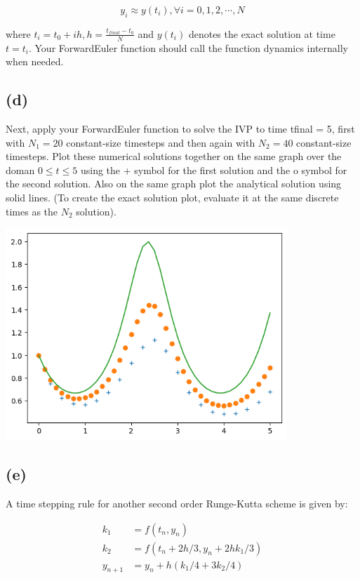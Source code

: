 \documentclass[11pt]{article}
\begin{document}
\[ y_i \approx y(t_i), \forall i = 0, 1, 2, \cdots, N \]

where $t_i = t_0 + ih, h = \frac{t_{final} - t_0}{N}$ and $y(t_i)$ denotes the exact solution at time $t = t_i$. Your ForwardEuler function should call the function dynamics internally when needed.

\subsection{(d)}

Next, apply your ForwardEuler function to solve the IVP to time tfinal = 5, first with $N_1 = 20$ constant-size timesteps and then again with $N_2 = 40$ constant-size timesteps. Plot these numerical solutions together on the same graph over the doman $0 \leq t \leq 5$ using the + symbol for the first solution and the o symbol for the second solution. Also on the same graph plot the analytical solution using solid lines. (To create the exact solution plot, evaluate it at the same discrete times as the $N_2$ solution).

\includegraphics[width=300pt]{a2q1_1.png}

\subsection{(e)} 

A time stepping rule for another second order Runge-Kutta scheme is given by:

\begin{align*}
  k_1 &= f(t_n, y_n) \\
  k_2 &= f(t_n + 2h/3, y_n + 2hk_1/3) \\
  y_{n + 1} &= y_n + h(k_1/4 + 3k_2/4) \\
\end{align*}
\end{document}
